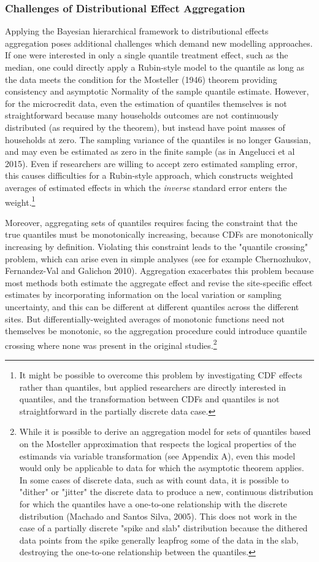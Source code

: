 \documentclass[english,12pt]{article}\usepackage{lmodern}
\numberwithin{equation}{section}
\begin{document}
\subsubsection{Challenges of Distributional Effect Aggregation}
Applying the Bayesian hierarchical framework to distributional effects aggregation poses additional challenges which demand new modelling approaches. If one were interested in only a single quantile treatment effect, such as the median, one could directly apply a Rubin-style model to the quantile as long as the data meets the condition for the Mosteller (1946) theorem providing consistency and asymptotic Normality of the sample quantile estimate. However, for the microcredit data, even the estimation of quantiles themselves is not straightforward because many households outcomes are not continuously distributed (as required by the theorem), but instead have point masses of households at zero. The sampling variance of the quantiles is no longer Gaussian, and may even be estimated as zero in the finite sample (as in Angelucci et al 2015). Even if researchers are willing to accept zero estimated sampling error, this causes difficulties for a Rubin-style approach, which constructs weighted averages of estimated effects in which the \emph{inverse} standard error enters the weight.\footnote{It might be possible to overcome this problem by investigating CDF effects rather than quantiles, but applied researchers are directly interested in quantiles, and the transformation between CDFs and quantiles is not straightforward in the partially discrete data case.}

Moreover, aggregating sets of quantiles requires facing the constraint that the true quantiles must be monotonically increasing, because CDFs are monotonically increasing by definition. Violating this constraint leads to the "quantile crossing" problem, which can arise even in simple analyses (see for example Chernozhukov, Fernandez-Val and Galichon 2010). Aggregation exacerbates this problem because most methods both estimate the aggregate effect and revise the site-specific effect estimates by incorporating information on the local variation or sampling uncertainty, and this can be different at different quantiles across the different sites.  But differentially-weighted averages of monotonic functions need not themselves be monotonic, so the aggregation procedure could introduce quantile crossing where none was present in the original studies.\footnote{While it is possible to derive an aggregation model for sets of quantiles based on the Mosteller approximation that respects the logical properties of the estimands via variable transformation (see Appendix A), even this model would only be applicable to data for which the asymptotic theorem applies. In some cases of discrete data, such as with count data, it is possible to "dither" or "jitter" the discrete data to produce a new, continuous distribution for which the quantiles have a one-to-one relationship with the discrete distribution (Machado and Santos Silva, 2005). This does not work in the case of a partially discrete "spike and slab" distribution because the dithered data points from the spike generally leapfrog some of the data in the slab, destroying the one-to-one relationship between the quantiles.}
\end{document}
